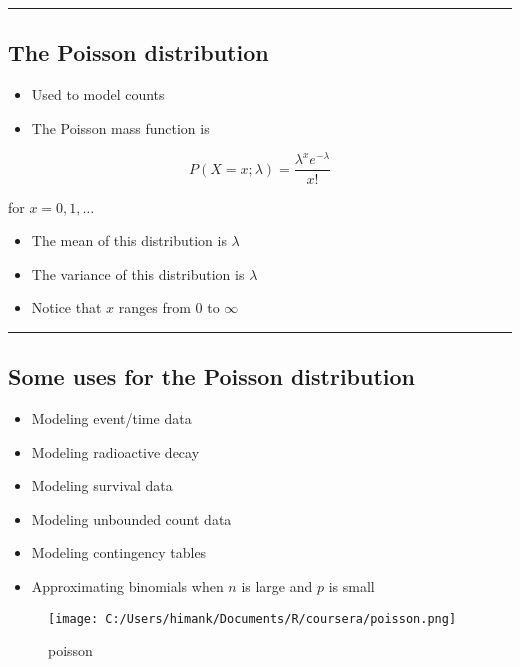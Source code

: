 \documentclass[]{article}
\begin{document}
\begin{center}\rule{0.5\linewidth}{\linethickness}\end{center}

\hypertarget{the-poisson-distribution}{%
\subsection{The Poisson distribution}\label{the-poisson-distribution}}

\begin{itemize}
\item
  Used to model counts
\item
  The Poisson mass function is
\end{itemize}

\[P(X = x; \lambda) = \frac{\lambda^x e^{-\lambda}}{x!}\]

for \(x=0,1,\ldots\)

\begin{itemize}
\item
  The mean of this distribution is \(\lambda\)
\item
  The variance of this distribution is \(\lambda\)
\item
  Notice that \(x\) ranges from \(0\) to \(\infty\)
\end{itemize}

\begin{center}\rule{0.5\linewidth}{\linethickness}\end{center}

\hypertarget{some-uses-for-the-poisson-distribution}{%
\subsection{Some uses for the Poisson
distribution}\label{some-uses-for-the-poisson-distribution}}

\begin{itemize}
\item
  Modeling event/time data
\item
  Modeling radioactive decay
\item
  Modeling survival data
\item
  Modeling unbounded count data
\item
  Modeling contingency tables
\item
  Approximating binomials when \(n\) is large and \(p\) is small
\end{itemize}

\begin{figure}
\centering
\texttt{[image: C:/Users/himank/Documents/R/coursera/poisson.png]}
\caption{poisson}
\end{figure}
\end{document}
